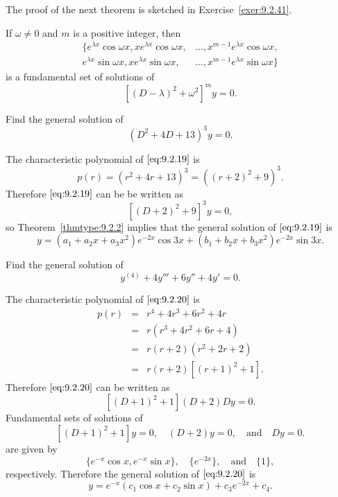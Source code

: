 \documentclass{ximera}
\begin{document}
The proof of the next theorem is sketched in Exercise~\ref{exer:9.2.41}.

\begin{theorem}\label{thmtype:9.2.2}
If $\omega \neq 0$ and $m$ is a positive integer, then
$$
\begin{array}{rl}
\{e^{\lambda x}\cos\omega x, xe^{\lambda x}\cos\omega x,
&\dots, x^{m-1}e^{\lambda x}\cos\omega x,\\
e^{\lambda x}\sin\omega x, xe^{\lambda x}\sin\omega x,&
\dots, x^{m-1}e^{\lambda x}\sin\omega x\}
\end{array}
$$
is a fundamental set of solutions of
$$
[(D-\lambda)^2+\omega^2]^my=0.
$$
\end{theorem}

\begin{example}\label{example:9.2.6}
Find the general solution of
\begin{equation} \label{eq:9.2.19}
(D^2+4D+13)^3y=0.
\end{equation}


\begin{explanation}  The characteristic polynomial of $\eqref{eq:9.2.19}$ is
$$
p(r)=(r^2+4r+13)^3=\left((r+2)^2+9\right)^3.
$$
Therefore $\eqref{eq:9.2.19}$ can be be written as
$$
[(D+2)^2+9]^3y=0,
$$
so Theorem~\ref{thmtype:9.2.2} implies that the general solution of
$\eqref{eq:9.2.19}$ is
$$
y=(a_1+a_2x+a_3x^2)e^{-2x}\cos3x
+(b_1+b_2x+b_3x^2)e^{-2x}\sin3x.
$$
\end{explanation}
\end{example}

\begin{example}\label{example:9.2.7}
Find the general solution of
\begin{equation} \label{eq:9.2.20}
y^{(4)}+4y'''+6y''+4y'=0.
\end{equation}


\begin{explanation}  The characteristic polynomial of $\eqref{eq:9.2.20}$ is
\begin{eqnarray*}
p(r)&=&r^4+4r^3+6r^2+4r\\
&=&r(r^3+4r^2+6r+4)\\
&=&r(r+2)(r^2+2r+2)\\
&=&r(r+2)[(r+1)^2+1].
\end{eqnarray*}
Therefore $\eqref{eq:9.2.20}$ can be written as
$$
[(D+1)^2+1](D+2)Dy=0.
$$
Fundamental sets of solutions of
$$
\left[(D+1)^2+1\right] y=0,\quad (D+2) y=0,\quad\mbox{and}\quad Dy=0.
$$
are given by
$$
\{e^{-x}\cos x,e^{-x}\sin x\},\quad \{e^{-2x}\},\quad\mbox{and}\quad \{1\},
$$
respectively. Therefore the general solution of $\eqref{eq:9.2.20}$ is
$$
y=e^{-x}(c_1\cos x+c_2\sin x)+c_3e^{-2x}+c_4.
$$
\end{explanation}
\end{example}
\end{document}
